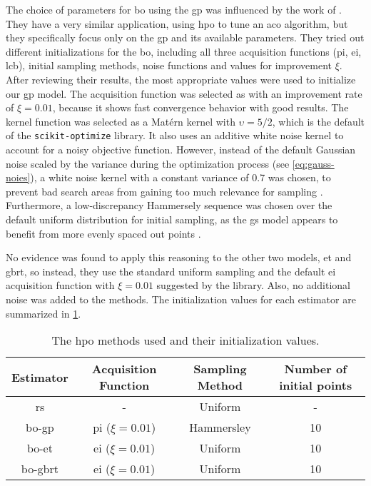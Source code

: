 The choice of parameters for \gls{bo} using the \gls{gp} was influenced by the work of \citet{yin2021bayesian}. They have a very similar application, using \glsdesc{hpo} to tune an \glsdesc{aco} algorithm, but they specifically focus only on the \gls{gp} and its available parameters. They tried out different initializations for the \gls{bo}, including all three acquisition functions (\gls{pi}, \gls{ei}, \gls{lcb}), initial sampling methods, noise functions and values for improvement $\xi$. After reviewing their results, the most appropriate values were used to initialize our \gls{gp} model. The acquisition function was selected as  with an improvement rate of $\xi = 0.01$, because it shows fast convergence behavior with good results. The kernel function was selected as a Matérn kernel with $\upsilon=5/2$, which is the default of the \texttt{scikit-optimize} library. It also uses an additive white noise kernel to account for a noisy objective function. However, instead of the default Gaussian noise scaled by the variance during the optimization process (see \cref{eq:gauss-noies}), a white noise kernel with a constant variance of 0.7 was chosen, to prevent bad search areas from gaining too much relevance for sampling \cite{yin2021bayesian}.
Furthermore, a low-discrepancy Hammersely sequence was chosen over the default uniform distribution for initial sampling, as the \gls{gs} model appears to benefit from more evenly spaced out points \cite{cervellera2013learning}. 

No evidence was found to apply this reasoning to the other two models, \gls{et} and \gls{gbrt}, so instead, they use the standard uniform sampling and the default \gls{ei} acquisition function with $\xi = 0.01$ suggested by the library. Also, no additional noise was added to the methods. The initialization values for each estimator are summarized in \cref{tab:opt-init}.

\begin{table}
	\centering
	 \caption[The \gls{hpo} methods used and their initialization values]{The \gls{hpo} methods used and their initialization values.}
	\label{tab:opt-init}
	\begin{tabular}{c|c|c|c}
		Estimator & Acquisition Function & Sampling Method & Number of initial points \\
		\hline
		\gls{rs} & - & Uniform & -\\
		\gls{bo}-\gls{gp} & \gls{pi} ($\xi=0.01$) & Hammersley & 10 \\
		\gls{bo}-\gls{et} & \gls{ei} ($\xi=0.01$) & Uniform & 10 \\
		\gls{bo}-\gls{gbrt} & \gls{ei} ($\xi=0.01$) & Uniform & 10 \\
	\end{tabular}
\end{table}

